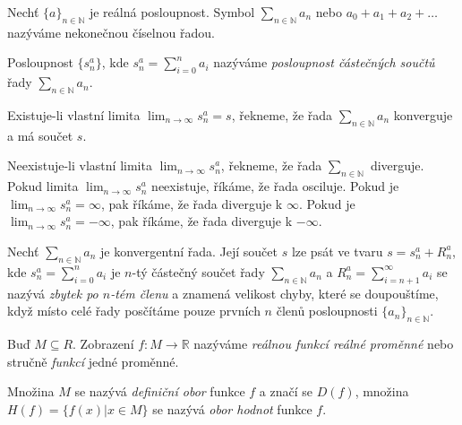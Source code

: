 \begin{definition}
Nechť $\{a\}_{n\in\mathbb{N}}$ je reálná posloupnost. Symbol $\sum_{n\in\mathbb{N}}a_n$ nebo $a_0 + a_1 + a_2 + \ldots$ nazýváme nekonečnou číselnou řadou.
\end{definition}

\begin{definition}
Posloupnost $\{s_n^a\}$, kde $s^a_n=\sum_{i=0}^na_i$ nazýváme \textit{posloupnost částečných sou\-čtů} řady $\sum_{n\in\mathbb{N}}a_n$.
\end{definition}

\begin{definition}
Existuje-li vlastní limita $\lim_{n\to\infty}s^a_n = s$, řekneme, že řada $\sum_{n\in\mathbb{N}}a_n$ konverguje a má součet $s$.
\end{definition}

\begin{definition}
Neexistuje-li vlastní limita $\lim_{n\to\infty}s^a_n$, řekneme, že řada $\sum_{n\in\mathbb{N}}$ diverguje. Pokud limita $\lim_{n\to\infty}s^a_n$ neexistuje, říkáme, že řada osciluje. Pokud je $\lim_{n\to\infty}s^a_n = \infty$, pak říkáme, že řada diverguje k $\infty$. Pokud je $\lim_{n\to\infty}s^a_n = -\infty$, pak říkáme, že řada diverguje k $-\infty$. 
\end{definition}

\begin{definition}
Nechť $\sum_{n\in\mathbb{N}}a_n$ je konvergentní řada. Její součet $s$ lze psát ve tvaru $s = s_n^a + R_n^a$, kde $s_n^a=\sum_{i=0}^na_i$ je $n$-tý částečný součet řady $\sum_{n\in\mathbb{N}}a_n$ a $R_n^a = \sum_{i=n+1}^{\infty}a_i$ se nazývá \textit{zbytek po $n$-tém členu} a znamená velikost chyby, které se doupouštíme, když místo celé řady posčítáme pouze prvních $n$ členů posloupnosti $\{a_n\}_{n\in\mathbb{N}}$.
\end{definition}

\begin{definition}
Buď $M\subseteq R$. Zobrazení $f:M\rightarrow\mathbb{R}$ nazýváme \textit{reálnou funkcí reálné proměnné} nebo stručně \textit{funkcí} jedné proměnné.

Množina $M$ se nazývá \textit{definiční obor} funkce $f$ a značí se $D(f)$, množina $H(f) = \{f(x) | x \in M \}$ se nazývá \textit{obor hodnot} funkce $f$. 
\end{definition}

